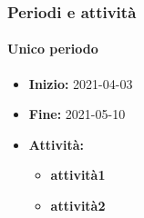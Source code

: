 \subsubsection{Periodi e attività}

\paragraph[Unico periodo]{Unico periodo}
\begin{itemize}
    \item [] \textbf{Inizio:} 2021-04-03
    \item [] \textbf{Fine:} 2021-05-10
    \item [] \textbf{Attività:}
          \begin{itemize}
              \item \textbf{attività1}
              \item \textbf{attività2}
          \end{itemize}
\end{itemize}